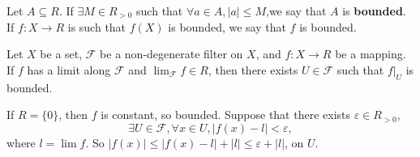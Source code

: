 \begin{definitionenv}
    Let $A\subseteq R$. If $\exists M\in R_{>0}$ such that $\forall a\in A, \left|a\right|\le M$,we say that $A$ is \textbf{bounded}. If $f:X\longrightarrow R$ is such that $f(X)$ is bounded, we say that $f$ is bounded.
\end{definitionenv}
\begin{corollaryenv}
    Let $X$ be a set, $\mathcal{F}$ be a non-degenerate filter on $X$, and $f:X\longrightarrow R$  be a mapping. If $f$ has a limit along $\mathcal{F}$ and $\lim_{\mathcal{F}}f\in R$, then there exists $U\in \mathcal{F}$ such that $f|_U$ is bounded.
\end{corollaryenv}
\begin{proofenv}
    If $R=\{0\}$, then $f$ is constant, so bounded. Suppose that there exists $\varepsilon\in R_{>0}$,
    $$\exists U\in \mathcal{F}, \forall x\in U, \left|f(x)-l\right|<\varepsilon,$$
    where $l=\lim f$. So $\left|f(x)\right|\le\left|f(x)-l\right|+\left|l\right|\le\varepsilon+\left|l\right|$, on $U$.
\end{proofenv}



